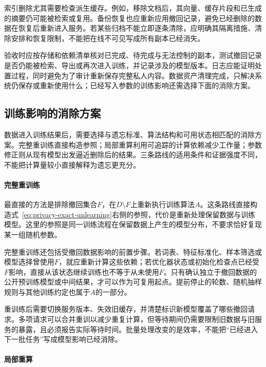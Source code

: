 索引删除尤其需要检查派生缓存。例如，移除文档后，其向量、缓存片段和已生成的摘要仍可能被检索或复用。备份恢复也应重新应用撤回记录，避免已经删除的数据在恢复后重新进入服务。若某些归档不能立即逐条清除，应明确其隔离措施、清除安排和恢复限制，不能把在线不可见写成所有副本已经消失。

验收时应按存储和依赖清单核对已完成、待完成与无法控制的副本，测试撤回记录是否仍能被检索、导出或再次进入训练，并记录涉及的模型版本。日志应能证明处置过程，同时避免为了审计重新保存完整私人内容。数据资产清理完成，只解决系统仍保存或重新使用什么；已经写入参数的训练影响还需选择下面的消除方案。

\subsection{训练影响的消除方案}
\label{sec:privacy-unlearning-methods}

数据进入训练结果后，需要选择与遗忘标准、算法结构和可用状态相匹配的消除方案。完整重训练直接构造参照；局部重算利用可追踪的计算依赖减少工作量；参数修正则从现有模型出发逼近删除后的结果。三条路线的适用条件和证据强度不同，不能把计算量较小直接解释为遗忘更充分。

\paragraph{完整重训练}

最直接的方法是排除撤回集合$F$，在$D\setminus F$上重新执行训练算法$A$。这条路线直接构造式~\eqref{eq:privacy-exact-unlearning}右侧的参照，代价是重新处理保留数据与训练模型。这里的参照是同一训练流程在保留数据上产生的模型分布，不要求恰好复现某一组随机参数。

完整重训练还包括受撤回数据影响的前置步骤。若词表、特征标准化、样本筛选或模型选择曾使用$F$，就应重新计算这些依赖；若优化器状态或初始化检查点已经受$F$影响，直接从该状态继续训练也不等于从未使用$F$。只有确认独立于撤回数据的公开预训练模型或中间结果，才可以作为可复用起点。提前停止的轮数、随机抽样规则与其他训练约定也属于$A$的一部分。

重训练后需要切换服务版本、失效旧缓存，并清楚标识新模型覆盖了哪些撤回请求。多项请求可以合并重训以减少重复计算，但等待期间仍需要限制旧数据与旧服务的暴露，且必须报告实际等待时间。批量处理改变的是效率，不能把“已经进入下一批任务”写成模型影响已经消除。

\paragraph{局部重算}

